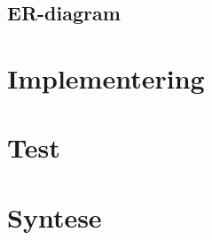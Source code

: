 \section{ER-diagram}

\chapter{Implementering}

\chapter{Test}

\chapter{Syntese}
%
%
%
\begingroup
\raggedright



%
%

\endgroup

\appendix



